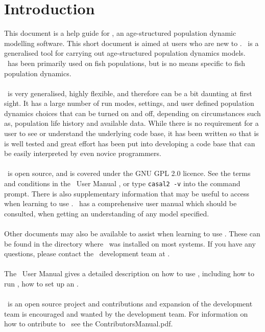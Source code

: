 \section{Introduction}\label{sec:introduction}

This document is a help guide for \CNAME, an age-structured population dynamic modelling software. This short document is aimed at users who are new to \CNAME. \CNAME\ is a generalised tool for carrying out age-structured population dynamics models. \CNAME\ has been primarily used on fish populations, but is no means specific to fish population dynamics. 
\\\\
\CNAME\ is very generalised, highly flexible, and therefore can be a bit daunting at first sight. It has a large number of run modes, settings, and user defined population dynamics choices that can be turned on and off, depending on circumstances such as, population life history and available data. While there is no requirement for a user to see or understand the underlying code base, it has been written so that is is well tested and great effort has been put into developing a code base that can be easily interpreted by even novice programmers.
\\\\
\CNAME\ is open source, and is covered under the GNU GPL 2.0 licence. See the terms and conditions in the \CNAME\ User Manual \citep{CASAL2}, or type \texttt{casal2 -v} into the command prompt. There is also supplementary information that may be useful to access when learning to use \CNAME. \CNAME\ has a comprehensive user manual \citep{CASAL2} which should be consulted, when getting an understanding of any model specified.
\\\\
Other documents may also be available to assist when learning to use \CNAME. These can be found in the directory where \CNAME\ was installed on most systems. If you have any questions, please contact the \CNAME\ development team at \email.
\\\\
The \CNAME\ User Manual \citep{CASAL2} gives a detailed description on how to use \CNAME, including how to run \CNAME, how to set up an \config.  
\\\\
\CNAME\ is an open source project and contributions and expansion of the development team is encouraged and wanted by the development team. For information on how to ontribute to \CNAME\ see the ContributorsManual.pdf.

